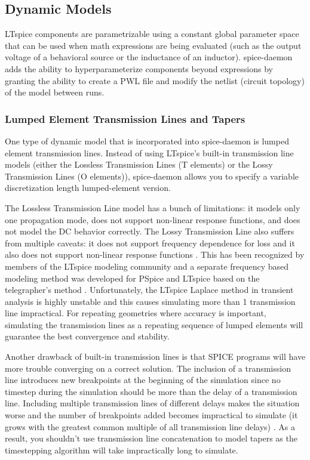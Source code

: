 \documentclass[]{article}
\begin{document}
\subsection{Dynamic Models} \label{dyn_models}

LTspice components are parametrizable using a constant global parameter space that can be used when
math expressions are being evaluated (such as the output voltage of a behavioral source or the inductance 
of an inductor). spice-daemon adds the ability to hyperparameterize components beyond expressions by granting the
ability to create a PWL file and modify the netlist (circuit topology) of the model between runs.

\subsubsection{Lumped Element Transmission Lines and Tapers}\label{tapers_section}

One type of dynamic model that is incorporated into spice-daemon is lumped 
element transmission lines. Instead of using LTspice's built-in transmission
line models (either the Lossless Transmission Lines (T elements) or the 
Lossy Transmission Lines (O elements)), spice-daemon allows you to specify a
variable discretization length lumped-element version. 

The Lossless Transmission Line model has a bunch of limitations: it models only one propagation mode,
 does not support non-linear response functions, and does not 
model the DC behavior correctly. The Lossy Transmission Line also suffers from multiple caveats:
it does not support frequency dependence for loss and it also does not support non-linear response 
functions \cite{ltwiki_tline_issues}. This has been recognized by members of the 
LTspice modeling community and a separate frequency based modeling method was developed
for PSpice and LTspice based on the telegrapher's method \cite{camron_model_tline}. Unfortunately, the LTspice
Laplace method in transient analysis is highly unstable and this causes simulating 
more than 1 transmission line impractical. For repeating geometries where accuracy is important, simulating the
transmission lines as a repeating sequence of lumped elements will guarantee the best
convergence and stability.

Another drawback of built-in transmission lines is that 
SPICE programs will have more trouble converging on a correct solution. 
The inclusion of a transmission line introduces new breakpoints at the beginning of the simulation since no timestep during the simulation should be more than the delay of a
transmission line. Including multiple transmission lines of different delays makes the 
situation worse and the number of breakpoints added becomes impractical to simulate (it grows with the 
greatest common multiple of all transmission line delays) \cite{spice-book}.
As a result, you shouldn't use transmission line concatenation to model tapers
as the timestepping algorithm will take impractically long to simulate.
\end{document}
